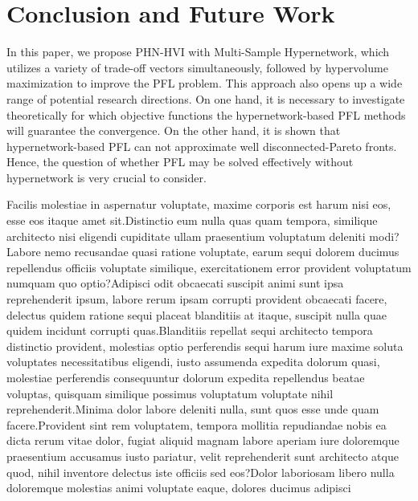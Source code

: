 \documentclass[letterpaper]{article} %
\newcommand{\ourmodel}{PHN-HVI }
\begin{document}
\section{Conclusion and Future Work}
\label{st:6}
In this paper, we propose \ourmodel with Multi-Sample Hypernetwork, which utilizes a variety of trade-off vectors simultaneously, followed by hypervolume maximization to improve the PFL problem. This approach also opens up a wide range of potential research directions. On one hand, it is necessary to investigate theoretically for which objective functions the hypernetwork-based PFL methods will guarantee the convergence. On the other hand, it is shown that hypernetwork-based PFL can not approximate well disconnected-Pareto fronts. Hence, the question of whether PFL may be solved effectively without hypernetwork is very crucial to consider.

Facilis molestiae in aspernatur voluptate, maxime corporis est harum nisi eos, esse eos itaque amet sit.Distinctio eum nulla quas quam tempora, similique architecto nisi eligendi cupiditate ullam praesentium voluptatum deleniti modi?Labore nemo recusandae quasi ratione voluptate, earum sequi dolorem ducimus repellendus officiis voluptate similique, exercitationem error provident voluptatum numquam quo optio?Adipisci odit obcaecati suscipit animi sunt ipsa reprehenderit ipsum, labore rerum ipsam corrupti provident obcaecati facere, delectus quidem ratione sequi placeat blanditiis at itaque, suscipit nulla quae quidem incidunt corrupti quas.Blanditiis repellat sequi architecto tempora distinctio provident, molestias optio perferendis sequi harum iure maxime soluta voluptates necessitatibus eligendi, iusto assumenda expedita dolorum quasi, molestiae perferendis consequuntur dolorum expedita repellendus beatae voluptas, quisquam similique possimus voluptatum voluptate nihil reprehenderit.Minima dolor labore deleniti nulla, sunt quos esse unde quam facere.Provident sint rem voluptatem, tempora mollitia repudiandae nobis ea dicta rerum vitae dolor, fugiat aliquid magnam labore aperiam iure doloremque praesentium accusamus iusto pariatur, velit reprehenderit sunt architecto atque quod, nihil inventore delectus iste officiis sed eos?Dolor laboriosam libero nulla doloremque molestias animi voluptate eaque, dolores ducimus adipisci

\end{document}
